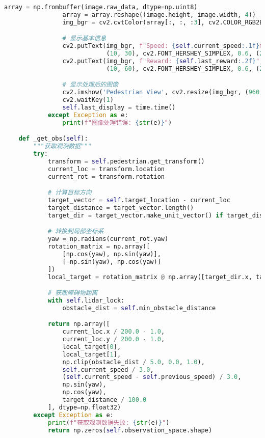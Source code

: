 \begin{lstlisting}[language=Python]
                array = np.frombuffer(image.raw_data, dtype=np.uint8)
                array = array.reshape((image.height, image.width, 4))
                img_bgr = cv2.cvtColor(array[:, :, :3], cv2.COLOR_RGB2BGR)

                # 显示基本信息
                cv2.putText(img_bgr, f"Speed: {self.current_speed:.1f}m/s",
                            (10, 30), cv2.FONT_HERSHEY_SIMPLEX, 0.6, (255, 255, 255), 1)
                cv2.putText(img_bgr, f"Reward: {self.last_reward:.2f}",
                            (10, 60), cv2.FONT_HERSHEY_SIMPLEX, 0.6, (255, 255, 255), 1)

                # 显示处理后的图像
                cv2.imshow('Pedestrian View', cv2.resize(img_bgr, (960, 480)))
                cv2.waitKey(1)
                self.last_display = time.time()
            except Exception as e:
                print(f"图像处理错误: {str(e)}")

    def _get_obs(self):
        """获取观测数据"""
        try:
            transform = self.pedestrian.get_transform()
            current_loc = transform.location
            current_rot = transform.rotation

            # 计算目标方向
            target_vector = self.target_location - current_loc
            target_distance = target_vector.length()
            target_dir = target_vector.make_unit_vector() if target_distance > 0 else carla.Vector3D()

            # 转换到局部坐标系
            yaw = np.radians(current_rot.yaw)
            rotation_matrix = np.array([
                [np.cos(yaw), np.sin(yaw)],
                [-np.sin(yaw), np.cos(yaw)]
            ])
            local_target = rotation_matrix @ np.array([target_dir.x, target_dir.y])

            # 获取障碍物距离
            with self.lidar_lock:
                obstacle_dist = self.min_obstacle_distance

            return np.array([
                current_loc.x / 200.0 - 1.0,
                current_loc.y / 200.0 - 1.0,
                local_target[0],
                local_target[1],
                np.clip(obstacle_dist / 5.0, 0.0, 1.0),
                self.current_speed / 3.0,
                (self.current_speed - self.previous_speed) / 3.0,
                np.sin(yaw),
                np.cos(yaw),
                target_distance / 100.0
            ], dtype=np.float32)
        except Exception as e:
            print(f"获取观测数据失败: {str(e)}")
            return np.zeros(self.observation_space.shape)


\end{lstlisting}
